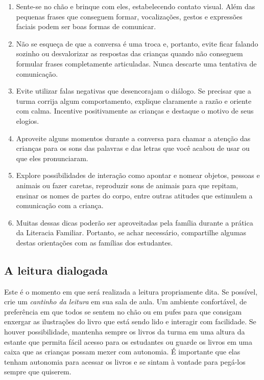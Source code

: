 \documentclass[11pt]{extarticle}
\begin{document}
\begin{enumerate}
\item Sente-se no chão e brinque com eles, estabelecendo 
contato visual. Além das pequenas frases que conseguem formar,
vocalizações, gestos e expressões faciais podem ser boas formas
de comunicar.

\item Não se esqueça de que a conversa é uma troca e, portanto, evite
ficar falando sozinho ou desvalorizar as respostas das crianças
quando não conseguem formular frases completamente
articuladas. Nunca descarte uma tentativa de comunicação.

\item Evite utilizar falas negativas que desencorajam o diálogo. 
Se precisar que a turma 
corrija algum comportamento, explique claramente a razão e 
oriente com calma. Incentive positivamente as crianças e 
destaque o motivo de seus elogios. 

\item Aproveite alguns momentos durante a conversa para chamar 
a atenção das crianças para os sons das palavras e das letras que você 
acabou de usar ou que eles pronunciaram.  

\item Explore possibilidades de interação como apontar e 
nomear objetos, pessoas e animais ou fazer caretas, reproduzir sons de 
animais para que repitam, ensinar os nomes de partes do corpo, 
entre outras atitudes que estimulem a comunicação com a criança. 

\item Muitas dessas dicas poderão ser aproveitadas pela 
família durante a prática da Literacia Familiar. Portanto, 
se achar necessário, compartilhe algumas destas orientações 
com as famílias dos estudantes.
\end{enumerate}


\subsection{A leitura dialogada}
Este é o momento em que será realizada a leitura propriamente dita. 
Se possível, crie um \textit{cantinho da leitura} em sua sala de aula. Um 
ambiente confortável, de preferência em que todos se sentem no chão ou 
em pufes para que consigam enxergar as ilustrações do livro que está 
sendo lido e interagir com facilidade. Se houver possibilidade, mantenha 
sempre os livros da turma em uma altura da estante que permita fácil 
acesso para os estudantes ou guarde os livros em uma caixa que as crianças 
possam mexer com autonomia. É importante que elas tenham autonomia para 
acessar os livros e se sintam à vontade para pegá-los sempre que quiserem. 
\end{document}
